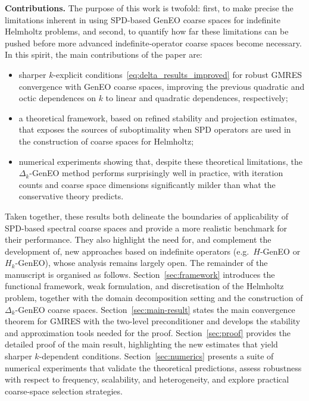 \documentclass[preprint,3p,times]{elsarticle}
\theoremstyle{definition}
\numberwithin{equation}{section}
\begin{document}
\medskip
\noindent
\textbf{Contributions.} The purpose of this work is twofold: first, to make precise the
limitations inherent in using SPD-based GenEO coarse spaces for indefinite Helmholtz problems,
and second, to quantify how far these limitations can be pushed before more advanced
indefinite-operator coarse spaces become necessary. In this spirit, the main contributions of the paper are:
\begin{itemize}
    \item sharper $k$-explicit conditions~\eqref{eq:delta_results_improved} for robust GMRES convergence with GenEO coarse spaces, 
    	improving the previous quadratic and octic dependences on $k$ to linear and quadratic dependences, respectively;
    \item a theoretical framework, based on refined stability and projection estimates, that exposes the sources of suboptimality 
    	when SPD operators are used in the construction of coarse spaces for Helmholtz;
    \item numerical experiments showing that, despite these theoretical limitations, the $\Delta_k$-GenEO method performs surprisingly well 
    	in practice, with iteration counts and coarse space dimensions significantly milder than what the conservative theory predicts. 
\end{itemize}
Taken together, these results both delineate the boundaries of applicability of SPD-based spectral coarse spaces and provide 
a more realistic benchmark for their performance.  They also highlight the need for, and complement the development of, 
new approaches based on indefinite operators (e.g.\ $H$-GenEO or $H_k$-GenEO), whose analysis remains largely open.
The remainder of the manuscript is organised as follows. 
Section~\ref{sec:framework} introduces the functional framework, weak formulation, and discretisation of the Helmholtz problem, together with the domain decomposition setting and the construction of $\Delta_k$-GenEO coarse spaces. 
Section~\ref{sec:main-result} states the main convergence theorem for GMRES with the two-level preconditioner and develops the stability and approximation tools needed for the proof. 
Section~\ref{sec:proof} provides the detailed proof of the main result, highlighting the new estimates that yield sharper $k$-dependent conditions. 
Section~\ref{sec:numerics} presents a suite of numerical experiments that validate the theoretical predictions, assess robustness with respect to frequency, scalability, and heterogeneity, and explore practical coarse-space selection strategies. 
\end{document}

